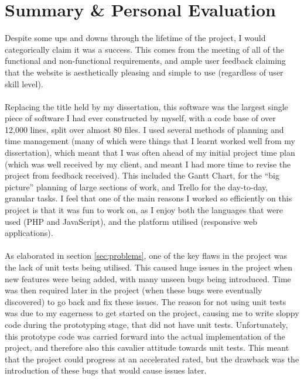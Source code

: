 \section{Summary \& Personal Evaluation}
Despite some ups and downs through the lifetime of the project, I would categorically claim it was a success. This comes from the meeting of all of the functional and non-functional requirements, and ample user feedback claiming that the website is aesthetically pleasing and simple to use (regardless of user skill level).
\ \\
\ \\
Replacing the title held by my dissertation, this software was the largest single piece of software I had ever constructed by myself, with a code base of over 12,000 lines, split over almost 80 files. I used several methods of planning and time management (many of which were things that I learnt worked well from my dissertation), which meant that I was often ahead of my initial project time plan (which was well received by my client, and meant I had more time to revise the project from feedback received). This included the Gantt Chart, for the ``big picture'' planning of large sections of work, and Trello for the day-to-day,  granular tasks. I feel that one of the main reasons I worked so efficiently on this project is that it was fun to work on, as I enjoy both the languages that were used (PHP and JavaScript), and the platform utilised (responsive web applications).\ \\
\ \\
As elaborated in section \ref{sec:problems}, one of the key flaws in the project was the lack of unit tests being utilised. This caused huge issues in the project when new features were being added, with many unseen bugs being introduced. Time was then required later in the project (when these bugs were eventually discovered) to go back and fix these issues. The reason for not using unit tests was due to my eagerness to get started on the project, causing me to write sloppy code during the prototyping stage, that did not have unit tests. Unfortunately, this prototype code was carried forward into the actual implementation of the project, and therefore also this cavalier attitude towards unit tests. This meant that the project could progress at an accelerated rated, but the drawback was the introduction of these bugs that would cause issues later.\ \\
\ \\
